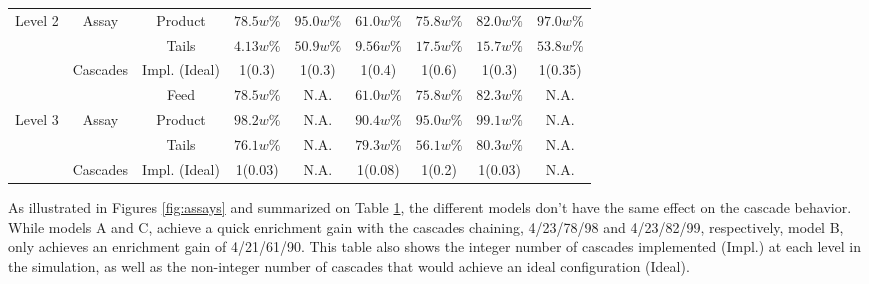 \begin{table}[h!]
\begin{tabular}{ccccccccc}
Level 2 & Assay      & Product    & $78.5w\%$ & $95.0w\%$ & $61.0w\%$ & $75.8w\%$ & $82.0w\%$ & $97.0w\%$ \\
        &            & Tails      & $4.13w\%$ & $50.9w\%$ & $9.56w\%$ & $17.5w\%$ & $15.7w\%$ & $53.8w\%$ \\
        & Cascades   & Impl. (Ideal)& 1(0.3)    & 1(0.3)    & 1(0.4)    & 1(0.6)    & 1(0.3)    & 1(0.35)   \\
\midrule                                                                                                 
        &            & Feed       & $78.5w\%$ & N.A.      & $61.0w\%$ & $75.8w\%$ & $82.3w\%$ & N.A.      \\
Level 3 & Assay      & Product    & $98.2w\%$ & N.A.      & $90.4w\%$ & $95.0w\%$ & $99.1w\%$ & N.A.      \\
        &            & Tails      & $76.1w\%$ & N.A.      & $79.3w\%$ & $56.1w\%$ & $80.3w\%$ & N.A.      \\
        & Cascades   & Impl. (Ideal)& 1(0.03)   & N.A.      & 1(0.08)   & 1(0.2)    & 1(0.03)   & N.A.      \\
\bottomrule
\end{tabular}
  \label{tab:level}
\end{table}

As illustrated in Figures \ref{fig:assays} and summarized on Table
\ref{tab:level}, the different models don't have the same effect on the
cascade behavior. While models A and C, achieve a quick enrichment gain with
the cascades chaining, 4/23/78/98 and 4/23/82/99, respectively, model B, only
achieves an enrichment gain of 4/21/61/90.  This table also shows the integer
number of cascades implemented (Impl.) at each level in the simulation, as well as the
non-integer number of cascades that would achieve an ideal configuration (Ideal).


